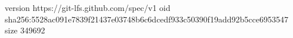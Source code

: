 version https://git-lfs.github.com/spec/v1
oid sha256:5528ac091e7839f21437e03748b6c6dcedf933c50390f19add92b5cce6953547
size 349692
